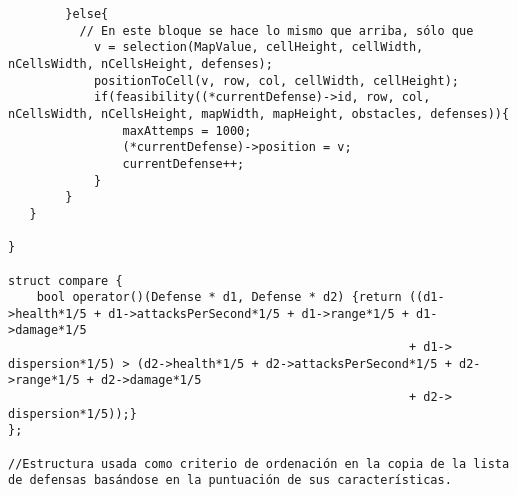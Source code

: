 \begin{lstlisting}
        }else{
          // En este bloque se hace lo mismo que arriba, sólo que 
            v = selection(MapValue, cellHeight, cellWidth, nCellsWidth, nCellsHeight, defenses);
            positionToCell(v, row, col, cellWidth, cellHeight);
            if(feasibility((*currentDefense)->id, row, col, nCellsWidth, nCellsHeight, mapWidth, mapHeight, obstacles, defenses)){
                maxAttemps = 1000;
                (*currentDefense)->position = v;
                currentDefense++;
            } 
        }
   }
   
}

struct compare {
    bool operator()(Defense * d1, Defense * d2) {return ((d1->health*1/5 + d1->attacksPerSecond*1/5 + d1->range*1/5 + d1->damage*1/5
                                                        + d1-> dispersion*1/5) > (d2->health*1/5 + d2->attacksPerSecond*1/5 + d2->range*1/5 + d2->damage*1/5
                                                        + d2-> dispersion*1/5));}
};

//Estructura usada como criterio de ordenación en la copia de la lista de defensas basándose en la puntuación de sus características.

\end{lstlisting}
